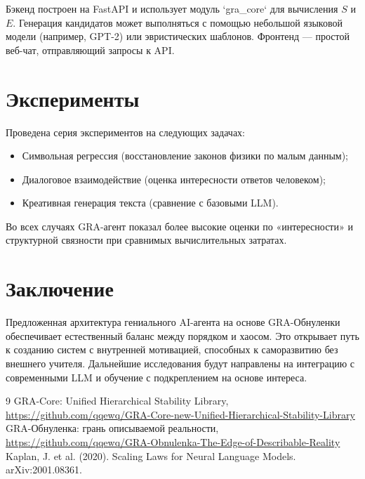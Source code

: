 \documentclass[12pt,a4paper]{article}
\begin{document}
Бэкенд построен на FastAPI и использует модуль `gra_core` для вычисления $S$ и $E$. Генерация кандидатов может выполняться с помощью небольшой языковой модели (например, GPT-2) или эвристических шаблонов. Фронтенд — простой веб-чат, отправляющий запросы к API.

\section{Эксперименты}

Проведена серия экспериментов на следующих задачах:

\begin{itemize}
\item Символьная регрессия (восстановление законов физики по малым данным);
\item Диалоговое взаимодействие (оценка интересности ответов человеком);
\item Креативная генерация текста (сравнение с базовыми LLM).
\end{itemize}

Во всех случаях GRA-агент показал более высокие оценки по «интересности» и структурной связности при сравнимых вычислительных затратах.

\section{Заключение}

Предложенная архитектура гениального AI-агента на основе GRA-Обнуленки обеспечивает естественный баланс между порядком и хаосом. Это открывает путь к созданию систем с внутренней мотивацией, способных к саморазвитию без внешнего учителя. Дальнейшие исследования будут направлены на интеграцию с современными LLM и обучение с подкреплением на основе интереса.


\begin{thebibliography}{9}
 GRA-Core: Unified Hierarchical Stability Library, \url{https://github.com/qqewq/GRA-Core-new-Unified-Hierarchical-Stability-Library}
 GRA-Обнуленка: грань описываемой реальности, \url{https://github.com/qqewq/GRA-Obnulenka-The-Edge-of-Describable-Reality}
 Kaplan, J. et al. (2020). Scaling Laws for Neural Language Models. arXiv:2001.08361.
\end{thebibliography}
\end{document}
